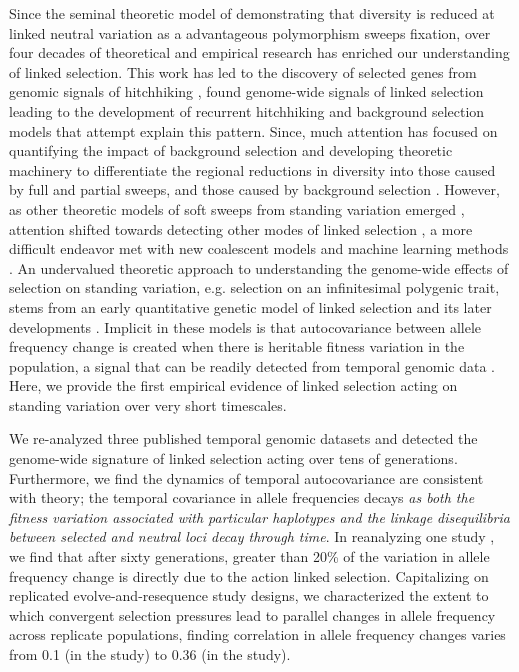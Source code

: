 \documentclass[11pt]{article}
\newcommand{\vb}[1]{{\it \color{blue} #1}}
\newcommand{\graham}[1]{\todo[size=\scriptsize, color=red!50]{#1}}
\begin{document}
Since the seminal theoretic model of \textcite{Maynard_Smith1974-lc}
demonstrating that diversity is reduced at linked neutral variation as a
advantageous polymorphism sweeps fixation, over four decades of theoretical and
empirical research has enriched our understanding of linked selection. This
work has led to the discovery of selected genes from genomic signals of
hitchhiking \parencite{Nair2003-tw,Voight2006-rn}, found genome-wide signals of
linked selection
\parencite{Aguade1989-jx,Begun1992-ey,Cutter2010-gi,Andersen2012-bj,Cutter2003-tl}
leading to the development of recurrent hitchhiking \parencite{Stephan1992-jc}
and background selection \parencite{Charlesworth1993-gb} models that attempt
explain this pattern. Since, much attention has focused on quantifying the
impact of background selection \parencite{McVicker2009-ax} and developing
theoretic machinery \parencite{Coop2012-cd} to differentiate the regional
reductions in diversity into those caused by full and partial sweeps, and those
caused by background selection \parencite{Elyashiv2016-vt}. However, as other
theoretic models of soft sweeps from standing variation emerged
\parencite{Hermisson2005-hs,Pennings2006-lj}, attention shifted towards
detecting other modes of linked selection \parencite{Pritchard2010-tk}, a more
difficult endeavor \parencite{Przeworski2005-bg} met with new coalescent models
\parencite{Berg2015-xj} and machine learning methods
\parencite{Schrider2017-yx}. An undervalued theoretic approach to understanding
the genome-wide effects of selection on standing variation, e.g. selection on
an infinitesimal polygenic trait, stems from an early quantitative genetic
model of linked selection \parencite{Robertson1961-ho} and its later
developments \parencite{Santiago1995-hx,Santiago1998-bs}. Implicit in these
models is that autocovariance between allele frequency change is created when
there is heritable fitness variation in the population, a signal that can be
readily detected from temporal genomic data \parencite{Buffalo2019-io}. Here,
we provide the first empirical evidence of linked selection acting on standing
variation over very short timescales.

We re-analyzed three published temporal genomic datasets and detected the
genome-wide signature of linked selection acting over tens of generations.
Furthermore, we find the dynamics of temporal autocovariance are consistent
with theory; the temporal covariance in allele frequencies decays \vb{as both
  the fitness variation associated with particular haplotypes and the linkage
disequilibria between selected and neutral loci decay through time}. In
reanalyzing one study \parencite{Barghi2019-qy}, we find that after sixty
generations, greater than 20\% of the variation in allele frequency change is
directly due to the action linked selection. Capitalizing on replicated
evolve-and-resequence study designs, we characterized the extent to which
convergent selection pressures lead to parallel changes in allele frequency
across replicate populations, finding correlation in allele frequency
changes varies from 0.1 (in the \cite{Barghi2019-qy} study) to 0.36 (in the
\cite{Kelly2019-dc} study). \graham{Are these just repeat numbers from main
text? If so nix this sentence}
\end{document}
